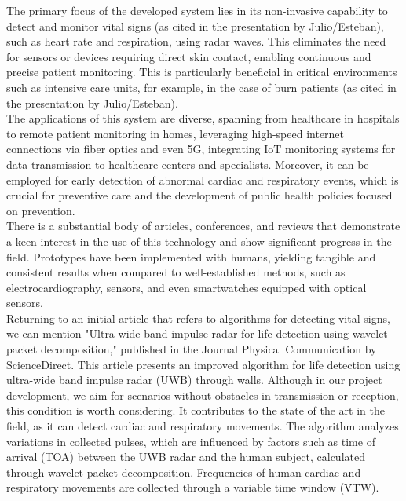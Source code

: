 \documentclass[lettersize,journal]{IEEEtran}
\begin{document}
The primary focus of the developed system lies in its non-invasive capability to detect and monitor vital signs (as cited in the presentation by Julio/Esteban), such as heart rate and respiration, using radar waves. This eliminates the need for sensors or devices requiring direct skin contact, enabling continuous and precise patient monitoring. This is particularly beneficial in critical environments such as intensive care units, for example, in the case of burn patients (as cited in the presentation by Julio/Esteban).\\

The applications of this system are diverse, spanning from healthcare in hospitals to remote patient monitoring in homes, leveraging high-speed internet connections via fiber optics and even 5G, integrating IoT monitoring systems for data transmission to healthcare centers and specialists. Moreover, it can be employed for early detection of abnormal cardiac and respiratory events, which is crucial for preventive care and the development of public health policies focused on prevention.\\

There is a substantial body of articles, conferences, and reviews that demonstrate a keen interest in the use of this technology and show significant progress in the field. Prototypes have been implemented with humans, yielding tangible and consistent results when compared to well-established methods, such as electrocardiography, sensors, and even smartwatches equipped with optical sensors.\\

Returning to an initial article that refers to algorithms for detecting vital signs, we can mention "Ultra-wide band impulse radar for life detection using wavelet packet decomposition," published in the Journal Physical Communication by ScienceDirect. This article presents an improved algorithm for life detection using ultra-wide band impulse radar (UWB) through walls. Although in our project development, we aim for scenarios without obstacles in transmission or reception, this condition is worth considering. It contributes to the state of the art in the field, as it can detect cardiac and respiratory movements. The algorithm analyzes variations in collected pulses, which are influenced by factors such as time of arrival (TOA) between the UWB radar and the human subject, calculated through wavelet packet decomposition. Frequencies of human cardiac and respiratory movements are collected through a variable time window (VTW).\\
\end{document}
